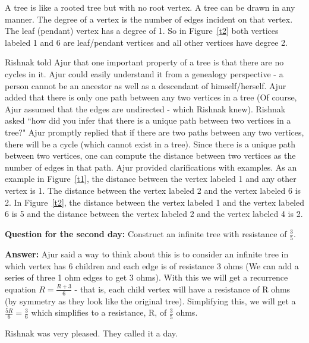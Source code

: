 A tree is like a rooted tree but with no root vertex. A tree can be drawn in any manner. The degree of a vertex is the number of edges incident on that vertex. The leaf (pendant) vertex has a degree of 1. So in Figure~\ref{t2} both vertices labeled 1 and 6 are leaf/pendant vertices and all other vertices have degree 2. 

Rishnak told Ajur that one important property of a tree is that there are no cycles in it. Ajur could easily understand it from a genealogy perspective - a person cannot be an ancestor as well as a descendant of himself/herself.  Ajur added that there is only one path between any two vertices in a tree (Of course, Ajur assumed that the edges are undirected - which Rishnak knew). Rishnak asked ``how did you infer that there is a unique path between two vertices in a tree?" Ajur promptly replied that if there are two paths between any two vertices, there will be a cycle (which cannot exist in a tree). Since there is a unique path between two vertices, one can compute the distance between two vertices as the number of edges in that path. Ajur provided clarifications with examples.  As an example in Figure~\ref{t1}, the distance between the vertex labeled 1 and any other vertex is 1. The distance between the vertex labeled 2 and the vertex labeled 6 is 2. In Figure~\ref{t2}, the distance between the vertex labeled 1 and the vertex labeled 6 is 5 and the distance between the vertex labeled 2 and the vertex labeled 4 is 2.

\textbf{Question for the second day:} Construct an infinite tree with resistance of $\frac{3}{5}$.

\textbf{Answer:} Ajur said a way to think about this is to consider an infinite tree in which vertex has 6 children and each edge is of resistance 3 ohms (We can add a series of three 1 ohm edges to get 3 ohms).
With this we will get a recurrence equation $R=\frac{R+3}{6}$ - that is, each child vertex will have a resistance of R ohms (by symmetry as they look like the original tree). Simplifying this, we will get a $\frac{5R}{6}=\frac{3}{6}$ which simplifies to a resistance, R, of $\frac{3}{5}$ ohms.

Rishnak was very pleased. They called it a day.